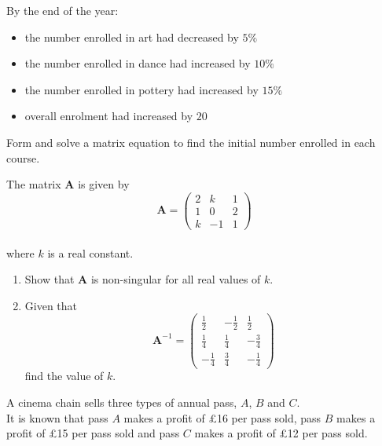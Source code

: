 \documentclass[leqno]{article}
\begin{document}
\begin{enumerate}[
  label=\textbf{\arabic*.},
  leftmargin=*,
  topsep=0pt,
  partopsep=0pt,
  parsep=0pt
]
By the end of the year:
\begin{itemize}
\item the number enrolled in art had decreased by $5\%$
\item the number enrolled in dance had increased by $10\%$
\item the number enrolled in pottery had increased by $15\%$
\item overall enrolment had increased by $20$
\end{itemize}
Form and solve a matrix equation to find the initial number enrolled in each course.  \\

\newpage

\questionitem

The matrix $\mathbf{A}$ is given by
\[
\mathbf{A}=\begin{pmatrix}
2 & k & 1\\
1 & 0 & 2\\
k & -1 & 1
\end{pmatrix}
\] \\
where $k$ is a real constant. \\

\begin{enumerate}[label=\textbf{(\alph*)}]
  \item Show that $\mathbf{A}$ is non-singular for all real values of $k$.  \\
  \item Given that
  \[
\renewcommand{\arraystretch}{1.5}
\mathbf{A}^{-1}=\begin{pmatrix}
  \tfrac{1}{2} & -\frac{1}{2} & \frac{1}{2}\\
  \frac{1}{4} & \frac{1}{4} & -\frac{3}{4}\\
  -\frac{1}{4} & \frac{3}{4} & -\frac{1}{4}
\end{pmatrix}
  \]
  find the value of $k$.  \\
\end{enumerate}

\newpage

\questionitem

A cinema chain sells three types of annual pass, $A$, $B$ and $C$. \\

It is known that pass $A$ makes a profit of \pounds 16 per pass sold, pass $B$ makes a profit of \pounds 15 per pass sold and pass $C$ makes a profit of \pounds 12 per pass sold. \\


\end{enumerate}
\end{document}
